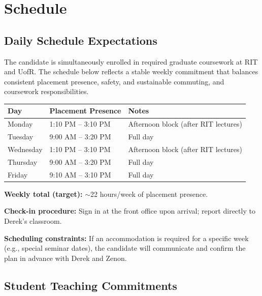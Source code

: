 \documentclass[10pt]{article}
\begin{document}
\section{Schedule}

\subsection{Daily Schedule Expectations}

The candidate is simultaneously enrolled in required graduate coursework at RIT and UofR. The schedule below reflects a stable weekly commitment that balances consistent placement presence, safety, and sustainable commuting, and coursework responsibilities.

\begin{center}
\begin{tabular}{|l|l|l|}
\hline
\textbf{Day} & \textbf{Placement Presence} & \textbf{Notes} \\
\hline
Monday    & 1:10 PM -- 3:10 PM  & Afternoon block (after RIT lectures) \\
Tuesday   & 9:00 AM -- 3:20 PM  & Full day \\
Wednesday & 1:10 PM -- 3:10 PM  & Afternoon block (after RIT lectures) \\
Thursday  & 9:00 AM -- 3:20 PM  & Full day \\
Friday    & 9:10 AM -- 3:10 PM  & Full day \\
\hline
\end{tabular}
\end{center}

\textbf{Weekly total (target):} $\sim$22 hours/week of placement presence.

\textbf{Check-in procedure:} Sign in at the front office upon arrival; report directly to Derek's classroom.

\textbf{Scheduling constraints:} If an accommodation is required for a specific week (e.g., special seminar dates), the candidate will communicate and confirm the plan in advance with Derek and Zenon.

\subsection{Student Teaching Commitments}
\end{document}
